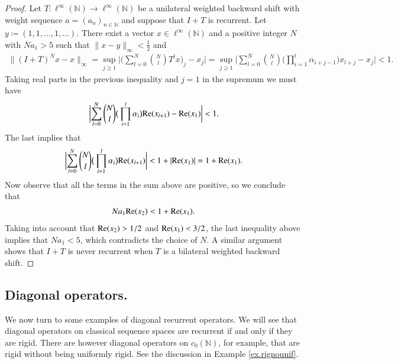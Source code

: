 \documentclass[12pt,leqno]{amsart}
\theoremstyle{plain}
\theoremstyle{definition}
\numberwithin{equation}{section}
\begin{document}
\begin{proof}
	Let $T:\ell^\infty(\mathbb N) \to \ell^\infty(\mathbb N)$ be a unilateral weighted backward shift with weight sequence $a=(a_n)_{n\in\mathbb N}$ and suppose that $I+T$ is recurrent. Let $y\coloneqq (1,1,\ldots,1,\ldots)$. There exist a vector $x\in\ell^\infty(\mathbb N)$ and a positive integer $N$ with $Na_1>5$ such that $\|x-y\|_\infty<\frac{1}{2}$ and 
	\begin{align*}
		\| (I+T)^N x-x\|_\infty= \sup_{j\geq 1} {\biggl\lvert{ \bigg( \sum_{l=0} ^N \binom{N}{l}T^l x \bigg)_j -x_j}\biggr\rvert} = \sup_{j\geq 1} {\biggl\lvert{ \sum_{l=0} ^N \binom{N}{l}\big(\prod_{i=1}^{l}\alpha_{i+j-1}\big)x_{l+j}-x_j }\biggr\rvert} <1. 
	\end{align*}
	Taking real parts in the previous inequality and $j=1$ in the supremum we must have 
	\begin{align*}
		{\biggl\lvert{ \sum_{l=0} ^N \binom{N}{l}\big(\prod_{i=1}^{l}\alpha_i \big)\textnormal{Re} (x_{l+1}) -\textnormal{Re} (x_1)}\biggr\rvert} <1. 
	\end{align*}
	The last implies that 
	\begin{align*}
		{\biggl\lvert{ \sum_{l=0} ^N \binom{N}{l}\big(\prod_{i=1}^{l}\alpha_i \big)\textnormal{Re} (x_{l+1}) }\biggr\rvert} <1+|\textnormal{Re} (x_1)|=1+\textnormal{Re} (x_1) . 
	\end{align*}
	Now observe that all the terms in the sum above are positive, so we conclude that 
	\begin{align*}
		N a_1\textnormal{Re}(x_2) < 1+\textnormal{Re} (x_1) . 
	\end{align*}
	Taking into account that $\textnormal{Re}(x_2)>1/2$ and $\textnormal{Re}(x_1)<3/2$, the last inequality above implies that $Na_1<5$, which contradicts the choice of $N$. A similar argument shows that $I+T$ is never recurrent when $T$ is a bilateral weighted backward shift. 
\end{proof}

\subsection{Diagonal operators.} We now turn to some examples of diagonal recurrent operators. We will see that diagonal operators on classical sequence spaces are recurrent if and only if they are rigid. There are however diagonal operators on $c_0(\mathbb N)$, for example, that are rigid without being uniformly rigid. See the discussion in Example \ref{ex.rignounif}.
\end{document}
